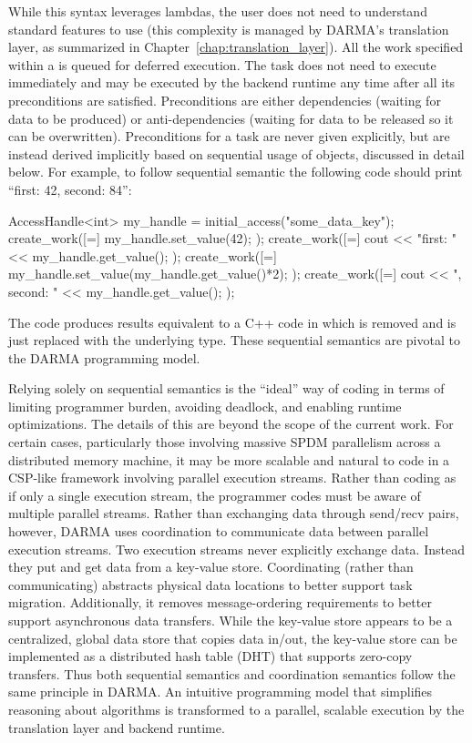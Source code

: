 While this syntax leverages  lambdas, the user does not need to understand  standard features to use  (this
complexity is managed by DARMA's translation layer, as summarized in Chapter~\ref{chap:translation_layer}). 
All the work specified within a  is queued for deferred execution. 
The task does not need to execute immediately and may be executed by the backend runtime any time after all its preconditions are satisfied. 
Preconditions are either dependencies (waiting for data to be produced) or anti-dependencies (waiting for data to be released so it can be overwritten).   
Preconditions for a task are never given explicitly, but are instead derived implicitly based on sequential usage of  objects, discussed in detail below.
For example, to follow sequential semantic the following code should print ``first: 42, second: 84'':
\begin{CppCode}
AccessHandle<int> my_handle = initial_access("some_data_key");
create_work([=]{
  my_handle.set_value(42);
});
create_work([=]{
  cout << "first: " << my_handle.get_value();
});
create_work([=]{
  my_handle.set_value(my_handle.get_value()*2);
});
create_work([=]{
  cout << ", second: " << my_handle.get_value();
});
\end{CppCode}
The code produces results equivalent to a C++ code in which  is removed and  is just replaced with the underlying type.
These sequential semantics are pivotal to the DARMA programming model.

Relying solely on sequential semantics is the ``ideal'' way of coding in terms of limiting programmer burden, avoiding deadlock, and enabling runtime optimizations.
The details of this are beyond the scope of the current work.
For certain cases, particularly those involving massive SPDM parallelism across a distributed memory machine,
it may be more scalable and natural to code in a CSP-like framework involving parallel execution streams.
Rather than coding as if only a single execution stream, the programmer codes must be aware of multiple parallel streams.
Rather than exchanging data through send/recv pairs, however, DARMA uses coordination to communicate data between parallel execution streams.
Two execution streams never explicitly exchange data. Instead they put and get data from a key-value store.
Coordinating (rather than communicating) abstracts physical data locations to better support task migration.
Additionally, it removes message-ordering requirements to better support asynchronous data transfers.
While the key-value store appears to be a centralized, global data store that copies data in/out,
the key-value store can be implemented as a distributed hash table (DHT) that supports zero-copy transfers.
Thus both sequential semantics and coordination semantics follow the same principle in DARMA.
An intuitive programming model that simplifies reasoning about algorithms is transformed to a parallel, scalable execution by the translation layer and backend runtime.


